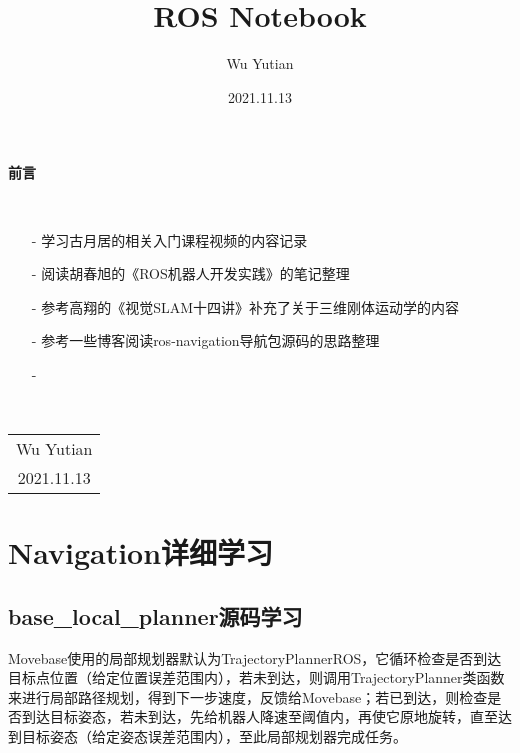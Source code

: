 \documentclass[9pt, oneside]{book}
\title{\Huge{\textbf{ROS Notebook}}}
\author{Wu Yutian}
\date{2021.11.13}
\begin{document}
\maketitle

\setcounter{page}{1}

\begin{center}
    \Huge\textbf{前言}
\end{center}~\

\normalsize
\begin{itemize}
    \item [-] 学习古月居的相关入门课程视频的内容记录
    \item [-] 阅读胡春旭的《ROS机器人开发实践》的笔记整理
    \item [-] 参考高翔的《视觉SLAM十四讲》补充了关于三维刚体运动学的内容
    \item [-] 参考一些博客阅读ros-navigation导航包源码的思路整理
    \item [-]
\end{itemize}

~\\
\begin{flushright}     
    \begin{tabular}{c}
        Wu Yutian\\
        2021.11.13
    \end{tabular}
\end{flushright}

\newpage
{}
\setcounter{page}{1}
\tableofcontents
\newpage
\setcounter{page}{1}





\chapter{Navigation详细学习}

\section{base\_local\_planner源码学习}

Movebase使用的局部规划器默认为TrajectoryPlannerROS，它循环检查是否到达目标点位置（给定位置误差范围内），若未到达，则调用TrajectoryPlanner类函数来进行局部路径规划，得到下一步速度，反馈给Movebase；若已到达，则检查是否到达目标姿态，若未到达，先给机器人降速至阈值内，再使它原地旋转，直至达到目标姿态（给定姿态误差范围内），至此局部规划器完成任务。
\end{document}
